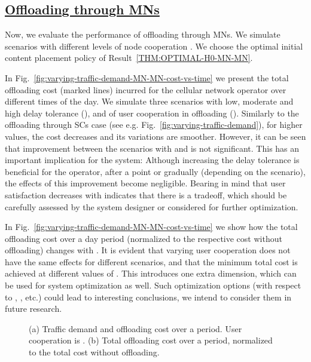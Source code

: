 \documentclass[10pt,conference,letterpaper]{IEEEtran}
\begin{document}
\subsection*{\underline{Offloading through MNs}} 
Now, we evaluate the performance of offloading through MNs. We simulate scenarios with different levels of node cooperation . We choose the optimal initial content placement policy of Result~\ref{THM:OPTIMAL-H0-MN-MN}.


In Fig.~\ref{fig:varying-traffic-demand-MN-MN-cost-vs-time} we present the total offloading cost (marked lines) incurred for the cellular network operator over different times of the day. We simulate three scenarios with low, moderate and high delay tolerance (), and  of user cooperation in offloading (). Similarly to the offloading through SCs case (see e.g. Fig.~\ref{fig:varying-traffic-demand}), for higher  values, the cost decreases and its variations are smoother. However, it can be seen that improvement between the scenarios with  and  is not significant. This has an important implication for the system: Although increasing the delay tolerance is beneficial for the operator, after a point or gradually (depending on the scenario), the effects of this improvement become negligible. Bearing in mind that user satisfaction decreases with  indicates that there is a tradeoff, which should be carefully assessed by the system designer or considered for further optimization.

In Fig.~\ref{fig:varying-traffic-demand-MN-MN-cost-vs-time} we show how the total offloading cost over a day period (normalized to the respective cost without offloading) changes with . It is evident that varying user cooperation does not have the same effects for different scenarios, and that the minimum total cost is achieved at different values of . This introduces one extra dimension, which can be used for system optimization as well. Such optimization options (with respect to , , etc.) could lead to interesting conclusions, we intend to consider them in future research.


\begin{figure}
\caption{(a) Traffic demand and offloading cost over a  period. User cooperation is . (b) Total offloading cost over a  period, normalized to the total cost without offloading.}\label{fig:varying-traffic-demand-MN-MN}
\end{figure}
\end{document}
